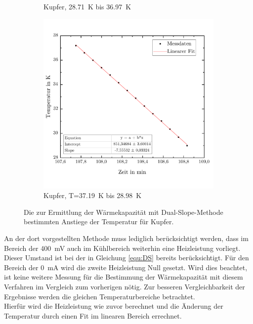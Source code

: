 \documentclass[parskip=half, a4paper,twoside,final]{article}
\begin{document}
\begin{figure}[ht!]
\begin{subfigure}[b!]{0.49\textwidth}
    \vspace{-1cm}
    \caption{Kupfer, \SI{28,71}{\kelvin} bis \SI{36,97}{\kelvin}}
  \end{subfigure}
  \hfill
  \begin{subfigure}[b!]{0.49\textwidth}
    \vspace{-.5cm}
    \includegraphics[width=\textwidth]{Bilder/37_19__28_98__Abfall.pdf}
    \vspace{-1cm}
    \caption{Kupfer, T=\SI{37,19}{\kelvin} bis \SI{28,98}{\kelvin}}
  \end{subfigure}
  \caption{Die zur Ermittlung der Wärmekapazität mit Dual-Slope-Methode bestimmten Anstiege der Temperatur für Kupfer.}
  \label{fig:DS_LineareFits_Kupfer}
\end{figure}

\newpage
An der dort vorgestellten Methode muss lediglich berücksichtigt werden, dass im Bereich der \SI{400}{\milli\volt} auch im Kühlbereich weiterhin eine Heizleistung vorliegt. Dieser Umstand ist bei der in Gleichung \eqref{equ:DS} bereits berücksichtigt. Für den Bereich der \SI{0}{\milli\ampere} wird die zweite Heizleistung Null gesetzt. Wird dies beachtet, ist keine weitere Messung für die Bestimmung der Wärmekapazität mit diesem Verfahren im Vergleich zum vorherigen nötig. Zur besseren Vergleichbarkeit der Ergebnisse werden die gleichen Temperaturbereiche betrachtet. \\
Hierfür wird die Heizleistung wie zuvor berechnet und die Änderung der Temperatur durch einen Fit im linearen Bereich errechnet.
\end{document}
